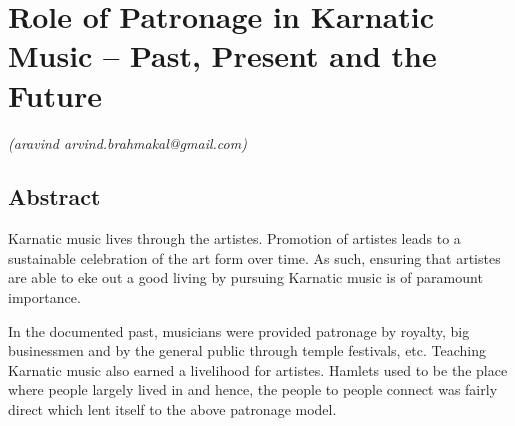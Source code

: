 
\chapter{Role of Patronage in Karnatic Music – Past, Present and the Future}\label{chapter8}



\vspace{-.3cm}

\begin{flushright}
\textit{(aravind arvind.brahmakal@gmail.com)} 
\end{flushright}


\section*{Abstract}

\vspace{-.2cm}

Karnatic music lives through the artistes. Promotion of artistes leads to a sustainable celebration of the art form over time. As such, ensuring that artistes are able to eke out a good living by pursuing Karnatic music is of paramount importance.

In the documented past, musicians were provided patronage by royalty, big businessmen and by the general public through temple festivals, etc. Teaching Karnatic music also earned a livelihood for artistes. Hamlets used to be the place where people largely lived in and hence, the people to people connect was fairly direct which lent itself to the above patronage model.

